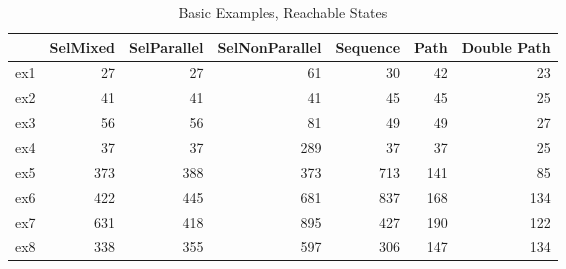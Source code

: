 \begin{table}
\centering
\caption{Basic Examples, Reachable States}
\label{b_e_reach}
\begin{tabular}{lrrrrrr}
\toprule
{} &  SelMixed &  SelParallel &  SelNonParallel &  Sequence &  Path &  Double Path \\
\midrule
ex1 &        27 &           27 &              61 &        30 &    42 &           23 \\
ex2 &        41 &           41 &              41 &        45 &    45 &           25 \\
ex3 &        56 &           56 &              81 &        49 &    49 &           27 \\
ex4 &        37 &           37 &             289 &        37 &    37 &           25 \\
ex5 &       373 &          388 &             373 &       713 &   141 &           85 \\
ex6 &       422 &          445 &             681 &       837 &   168 &          134 \\
ex7 &       631 &          418 &             895 &       427 &   190 &          122 \\
ex8 &       338 &          355 &             597 &       306 &   147 &          134 \\
\bottomrule
\end{tabular}
\end{table}
